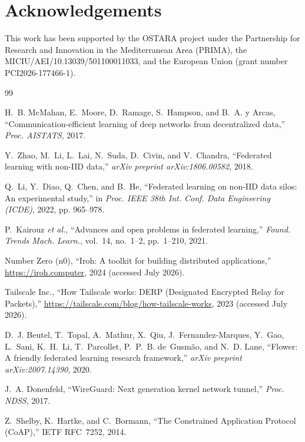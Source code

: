 ﻿\documentclass[journal]{IEEEtran}
\begin{document}
\section*{Acknowledgements}
This work has been supported by the OSTARA project under the Partnership for Research and Innovation in the Mediterranean Area (PRIMA), the MICIU/AEI/10.13039/501100011033, and the European Union (grant number PCI2026-177466-1).

\begin{thebibliography}{99}

H.~B. McMahan, E.~Moore, D.~Ramage, S.~Hampson, and B.~A. y Arcas,
``Communication-efficient learning of deep networks from decentralized data,''
\emph{Proc. AISTATS}, 2017.

Y.~Zhao, M.~Li, L.~Lai, N.~Suda, D.~Civin, and V.~Chandra,
``Federated learning with non-IID data,''
\emph{arXiv preprint arXiv:1806.00582}, 2018.

Q.~Li, Y.~Diao, Q.~Chen, and B.~He,
``Federated learning on non-IID data silos: An experimental study,''
in \emph{Proc. IEEE 38th Int. Conf. Data Engineering (ICDE)}, 2022, pp. 965--978.

P.~Kairouz \emph{et al.},
``Advances and open problems in federated learning,''
\emph{Found. Trends Mach. Learn.}, vol.~14, no.~1--2, pp.~1--210, 2021.

Number Zero (n0),
``Iroh: A toolkit for building distributed applications,''
\url{https://iroh.computer}, 2024 (accessed July 2026).

Tailscale Inc.,
``How Tailscale works: DERP (Designated Encrypted Relay for Packets),''
\url{https://tailscale.com/blog/how-tailscale-works}, 2023 (accessed July 2026).

D.~J. Beutel, T.~Topal, A.~Mathur, X.~Qiu, J.~Fernandez-Marques, Y.~Gao, L.~Sani, K.~H.~Li, T.~Parcollet, P.~P.~B. de~Gusm\~ao, and N.~D. Lane,
``Flower: A friendly federated learning research framework,''
\emph{arXiv preprint arXiv:2007.14390}, 2020.

J.~A. Donenfeld,
``WireGuard: Next generation kernel network tunnel,''
\emph{Proc. NDSS}, 2017.

Z.~Shelby, K.~Hartke, and C.~Bormann,
``The Constrained Application Protocol (CoAP),''
IETF RFC~7252, 2014.


\end{thebibliography}
\end{document}
